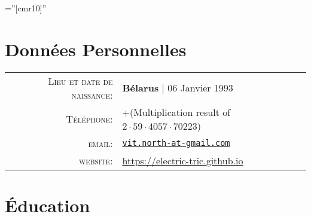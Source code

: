 \documentclass[a4paper,10pt]{article} %
\begin{document}
\pagestyle{empty} %

\font\fb=''[cmr10]'' %

\vfill


\par{\bigskip\par} %

\vfill

\section{Données Personnelles}

\begin{tabular}{rl}
\textsc{Lieu et date de naissance:}     & \textbf{Bélarus}  | 06 Janvier 1993 \\
    \textsc{Téléphone:} & +(Multiplication result of $2 \cdot 59 \cdot 4057 \cdot 70223$) \\
\textsc{email:} &
\href{mailto:vit.north@gmail.com}{\texttt{vit.north-at-gmail.com}} \\
\textsc{website:} &
\url{https://electric-tric.github.io}
\\

\end{tabular}

\vfill


\section{Éducation}
\end{document}
